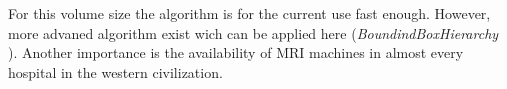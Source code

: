 For this volume size the algorithm is for the current use fast enough.
However, more advaned algorithm exist wich can be applied here (\eg \textit{BoundindBoxHierarchy} \cite{Karras2012}).
Another importance is the availability of \ac{MRI} machines in almost every hospital in the western civilization.
